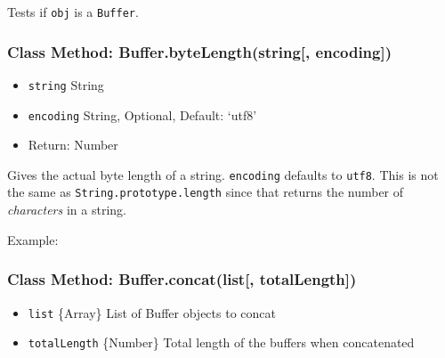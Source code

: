 Tests if \texttt{obj} is a \texttt{Buffer}.

\subsubsection{Class Method: Buffer.byteLength(string{[},
encoding{]})}\label{class-method-buffer.bytelengthstring-encoding}

\begin{itemize}
\itemsep1pt\parskip0pt
\item
  \texttt{string} String
\item
  \texttt{encoding} String, Optional, Default: `utf8'
\item
  Return: Number
\end{itemize}

Gives the actual byte length of a string. \texttt{encoding} defaults to
\texttt{\textquotesingle{}utf8\textquotesingle{}}. This is not the same
as \texttt{String.prototype.length} since that returns the number of
\emph{characters} in a string.

Example:

\begin{Shaded}
\begin{Highlighting}[]
\NormalTok{;}

 \NormalTok{+ } \NormalTok{+ } \NormalTok{+}
  \NormalTok{) + }\NormalTok{);}

\end{Highlighting}
\end{Shaded}

\subsubsection{Class Method: Buffer.concat(list{[},
totalLength{]})}\label{class-method-buffer.concatlist-totallength}

\begin{itemize}
\itemsep1pt\parskip0pt
\item
  \texttt{list} \{Array\} List of Buffer objects to concat
\item
  \texttt{totalLength} \{Number\} Total length of the buffers when
  concatenated
\end{itemize}

